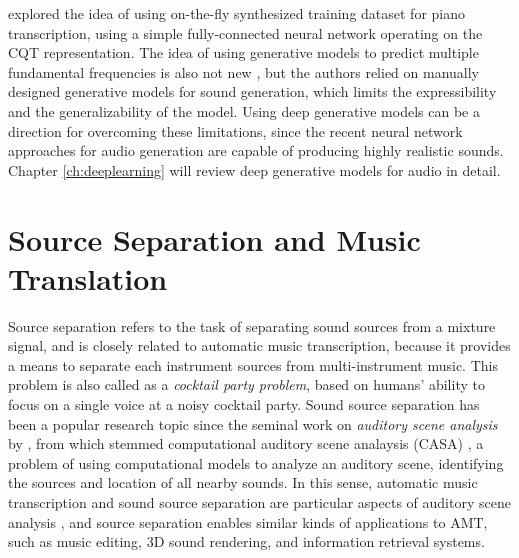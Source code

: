 
 explored the idea of using on-the-fly synthesized training dataset for piano transcription, using a simple fully-connected neural network operating on the CQT representation.
The idea of using generative models to predict multiple fundamental frequencies is also not new \cite{dubois2005harmonic,cemgil2006generative}, but the authors relied on manually designed generative models for sound generation, which limits the expressibility and the generalizability of the model.
Using deep generative models can be a direction for overcoming these limitations, since the recent neural network approaches for audio generation are capable of producing highly realistic sounds.
Chapter \ref{ch:deeplearning} will review deep generative models for audio in detail.


\section{Source Separation and Music Translation}\label{sec:separation}

Source separation refers to the task of separating sound sources from a mixture signal, and is closely related to automatic music transcription, because it provides a means to separate each instrument sources from multi-instrument music.
This problem is also called as a \emph{cocktail party problem}, based on humans' ability to focus on a single voice at a noisy cocktail party.
Sound source separation has been a popular research topic since the seminal work on \emph{auditory scene analysis} by , from which stemmed computational auditory scene analaysis (CASA) \cite{brown1994casa}, a problem of using computational models to analyze an auditory scene, identifying the sources and location of all nearby sounds.
In this sense, automatic music transcription and sound source separation are particular aspects of auditory scene analysis \cite{plumbley2002transcription}, and source separation enables similar kinds of applications to AMT, such as music editing, 3D sound rendering, and information retrieval systems.


